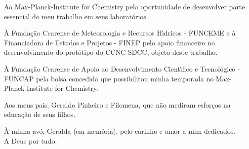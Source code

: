 Ao Max-Planck-Institute for Chemistry pela oportunidade de desenvolver parte essencial do meu trabalho em seus laborat\'{o}rios.

\`{A} Funda\c{c}\~{a}o Cearense de Meteorologia e Recursos H\'{\i}dricos - FUNCEME e \`{a} Financiadora de Estudos e Projetos - FINEP pelo apoio financeiro no desenvolvimento do prot\'{o}tipo do CCNC-SDCC, objeto deste trabalho.

\`{A} Funda\c{c}\~{a}o Cearense de Apoio ao Desenvolvimento Cient\'{\i}fico e Tecnol\'{o}gico - FUNCAP pela bolsa concedida que possibilitou minha temporada no Max-Planck-Institute for Chemistry.

Aos meus pais, Geraldo Pinheiro e Filomena, que n\~{a}o mediram esfor\c{c}os na educa\c{c}\~{a}o de seus filhos.

\`{A} minha av\'{o}, Geralda (em mem\'{o}ria), pelo carinho e amor a mim dedicados. \\




A Deus por tudo. 